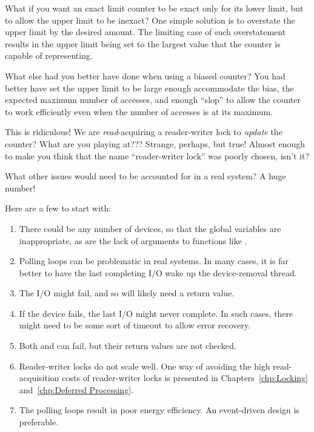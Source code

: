 \QuickQ{}
	What if you want an exact limit counter to be exact only for
	its lower limit, but to allow the upper limit to be inexact?
\QuickA{}
	One simple solution is to overstate the upper limit by the
	desired amount.
	The limiting case of such overstatement results in the
	upper limit being set to the largest value that the counter is
	capable of representing.

\QuickQ{}
	What else had you better have done when using a biased counter?
\QuickA{}
	You had better have set the upper limit to be large enough
	accommodate the bias, the expected maximum number of accesses,
	and enough ``slop'' to allow the counter to work efficiently
	even when the number of accesses is at its maximum.

\QuickQ{}
	This is ridiculous!
	We are \emph{read}-acquiring a reader-writer lock to
	\emph{update} the counter?
	What are you playing at???
\QuickA{}
	Strange, perhaps, but true!
	Almost enough to make you think that the name
	``reader-writer lock'' was poorly chosen, isn't it?

\QuickQ{}
	What other issues would need to be accounted for in a real system?
\QuickA{}
	A huge number!

	Here are a few to start with:

	\begin{enumerate}
	\item	There could be any number of devices, so that the
		global variables are inappropriate, as are the
		lack of arguments to functions like .
	\item	Polling loops can be problematic in real systems.
		In many cases, it is far better to have the last
		completing I/O wake up the device-removal thread.
	\item	The I/O might fail, and so  will likely
		need a return value.
	\item	If the device fails, the last I/O might never complete.
		In such cases, there might need to be some sort of
		timeout to allow error recovery.
	\item	Both  and  can
		fail, but their return values are not checked.
	\item	Reader-writer locks do not scale well.
		One way of avoiding the high read-acquisition costs
		of reader-writer locks is presented in
		Chapters~\ref{chp:Locking}
		and~\ref{chp:Deferred Processing}.
	\item	The polling loops result in poor energy efficiency.
		An event-driven design is preferable.
	\end{enumerate}

